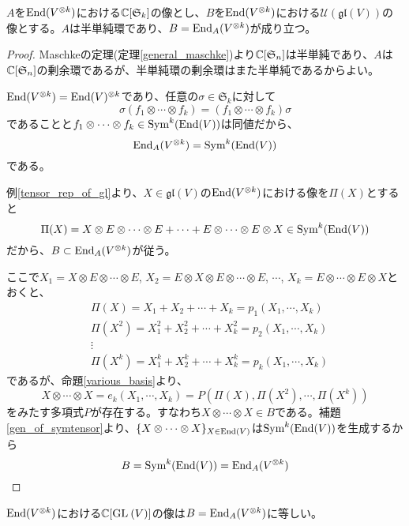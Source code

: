 \documentclass{ltjsreport}
\begin{document}
\begin{lemm}\label{lemma}
  $A$を$\text{End}(V^{\otimes k})$における$\mathbb{C}[\mathfrak{S}_k]$の像とし、$B$を$\text{End}(V^{\otimes k})$における$\mathcal{U}(\mathfrak{gl}(V))$の像とする。$A$は半単純環であり、$B=\text{End}_A(V^{\otimes k})$が成り立つ。
\end{lemm}

\begin{proof}
  Maschkeの定理(定理\ref{general_maschke})より$\mathbb{C}[\mathfrak{S}_n]$は半単純であり、$A$は$\mathbb{C}[\mathfrak{S}_n]$の剰余環であるが、半単純環の剰余環はまた半単純であるからよい。

  $\text{End}(V^{\otimes k})=\text{End}(V)^{\otimes k}$であり、任意の$\sigma\in \mathfrak{S}_k$に対して
  \[
    \sigma (f_1\otimes\cdots\otimes f_k)=(f_1\otimes\cdots\otimes f_k)\sigma
  \]
  であることと$f_1\otimes \cdots\otimes f_k\in\text{Sym}^k(\text{End}(V))$は同値だから、
  \[
  \text{End}_A(V^{\otimes k})=\text{Sym}^k(\text{End}(V))  
  \]
  である。

  例\ref{tensor_rep_of_gl}より、$X\in\mathfrak{gl}(V)$の$\text{End}(V^{\otimes k})$における像を$\Pi(X)$とすると
  \[
  \Pi(X)=X\otimes E\otimes \cdots\otimes E
  +\cdots 
  +E\otimes\cdots\otimes E\otimes X  \in \text{Sym}^k(\text{End}(V))
  \]
  だから、$B\subset \text{End}_A(V^{\otimes k})$が従う。

  ここで$X_1=X\otimes E\otimes\cdots\otimes E$, $X_2=E\otimes X\otimes E\otimes\cdots\otimes E$, $\cdots$, $X_k=E\otimes\cdots\otimes E\otimes X$とおくと、
  \begin{align*}
  &\Pi(X)=X_1+X_2+\cdots+X_k=p_1(X_1,\cdots,X_k)\\
  &\Pi(X^2)=X_1^2+X_2^2+\cdots+X_k^2=p_2(X_1,\cdots,X_k)\\
  &\vdots\\
  &\Pi(X^k)=X_1^k+X_2^k+\cdots+X_k^k=p_k(X_1,\cdots,X_k)
  \end{align*}
  であるが、命題\ref{various_basis}より、
  \[
  X\otimes\cdots\otimes X=e_k(X_1,\cdots,X_k)=P(\Pi(X),\Pi(X^2),\cdots,\Pi(X^k))  
  \]
  をみたす多項式$P$が存在する。すなわち$X\otimes \cdots\otimes X\in B$である。補題\ref{gen_of_symtensor}より、$\{X\otimes \cdots\otimes X\}_{X\in\text{End}(V)}$は$\text{Sym}^k(\text{End}(V))$を生成するから
  \[
  B=\text{Sym}^k(\text{End}(V))=\text{End}_A(V^{\otimes k})  
  \]
\end{proof}


\begin{lemm}\label{im_of_GL}
  $\text{End}(V^{\otimes k})$における$\mathbb{C}[\text{GL}\:(V)]$の像は$B=\text{End}_A(V^{\otimes k})$に等しい。
\end{lemm}
\end{document}

